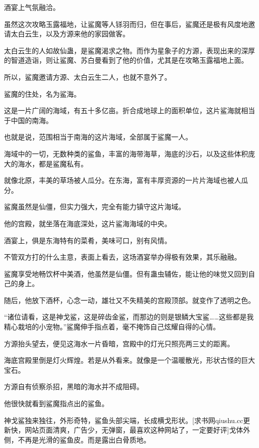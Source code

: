 
\begin{this_body}

酒宴上气氛融洽。

虽然这次攻略玉露福地，让鲨魔等人铩羽而归，但在事后，鲨魔还是极有风度地邀请太白云生，以及方源来他的家园做客。

太白云生的人如故仙蛊，是鲨魔渴求之物。而作为星象子的方源，表现出来的深厚的智道造诣，则让鲨魔、苏白曼看到了他的价值，尤其是在攻略玉露福地上面。

所以，鲨魔邀请方源、太白云生二人，也就不意外了。

鲨魔的住处，名为鲨海。

这是一片广阔的海域，有五十多亿亩。折合成地球上的面积单位，这片鲨海就相当于中国的南海。

也就是说，范围相当于南海的这片海域，全部属于鲨魔一人。

海域中的一切，无数种类的鲨鱼，丰富的海带海草，海底的沙石，以及这些体积庞大的海水，都是鲨魔私有。

就像北原，丰美的草场被人瓜分。在东海，富有丰厚资源的一片片海域也被人瓜分。

鲨魔虽然是仙僵，但实力强大，完全有能力镇守这片海域。

他的宫殿，就坐落在海底深处，这片鲨海海域的中央。

酒宴上，俱是东海特有的菜肴，美味可口，别有风情。

不管双方打的什么主意，表面上看去，这场酒宴举办得极有效果，其乐融融。

鲨魔享受地畅饮杯中美酒，他虽然是仙僵。但有蛊虫辅佐，能让他的味觉又回到自己的身上。

随后，他放下酒杯，心念一动，雄壮又不失精美的宫殿顶部。就变作了透明之色。

“诸位请看，这是神戈鲨，这是碎齿金鲨，而那边的则是银鳞大宝鲨……这些都是我精心栽培的小宠物。”鲨魔伸手指点着，毫不掩饰自己炫耀自得的心情。

方源抬头望去，便见这海水一片昏暗，宫殿中的灯光只照亮两三丈的距离。

海底宫殿里倒是灯火辉煌。若是从外看来。就像是一个温暖散光，形状古怪的巨大宝石。

方源自有侦察杀招，黑暗的海水并不成阻碍。

他很快就看到鲨魔指点出的鲨鱼。

神戈鲨独来独往，外形奇特，鲨鱼头部尖端，长成横戈形状。[求书网qiushu.cc更新快，网站页面清爽，广告少，无弹窗，最喜欢这种网站了，一定要好评]戈体外侧，不再是光滑的鲨鱼皮。而是露出白骨质地。


\end{this_body}
